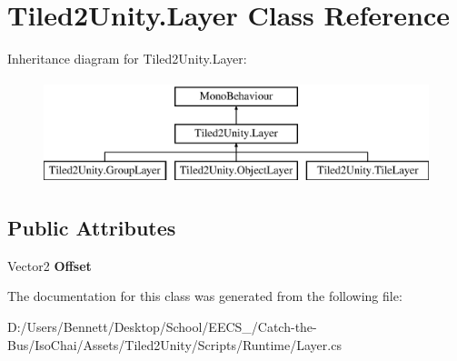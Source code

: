 \hypertarget{class_tiled2_unity_1_1_layer}{}\section{Tiled2\+Unity.\+Layer Class Reference}
\label{class_tiled2_unity_1_1_layer}
Inheritance diagram for Tiled2\+Unity.\+Layer\+:\begin{figure}[H]
\begin{center}
\leavevmode
\includegraphics[height=3.000000cm]{class_tiled2_unity_1_1_layer}
\end{center}
\end{figure}
\subsection*{Public Attributes}
\begin{DoxyCompactItemize}
\item 
\mbox{\label{class_tiled2_unity_1_1_layer_a59ea769705fb72a22ad0185d086001df}} 
Vector2 {\bfseries Offset}
\end{DoxyCompactItemize}


The documentation for this class was generated from the following file\+:\begin{DoxyCompactItemize}
\item 
D\+:/\+Users/\+Bennett/\+Desktop/\+School/\+E\+E\+C\+S\+\_/\+Catch-\/the-\/\+Bus/\+Iso\+Chai/\+Assets/\+Tiled2\+Unity/\+Scripts/\+Runtime/Layer.\+cs\end{DoxyCompactItemize}
